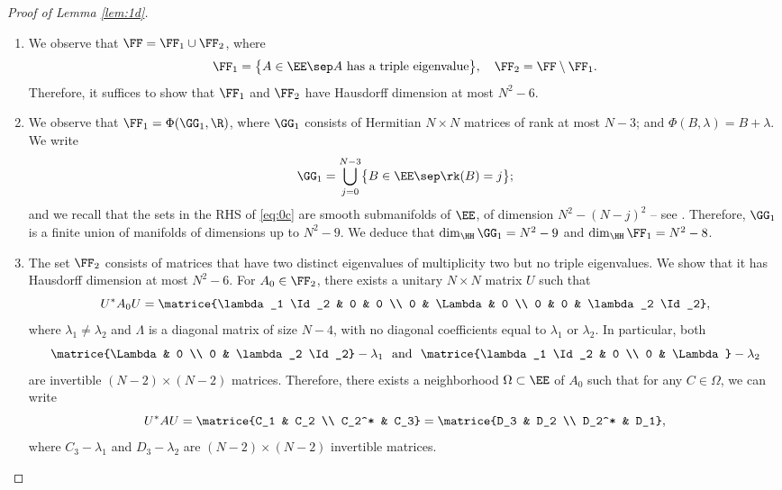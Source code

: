 \skpt
\begin{proof}[Proof of Lemma \ref{lem:1d}]
\begin{enumerate}
\item
We observe that $\FF= \FF_1 \cup \FF_2$, where
\begin{equation*}
\FF_1 = \bigl\{A \in \EE \sep \text{$A$ has a triple eigenvalue} \bigr\}, \quad
\FF_2 = \FF \setminus \FF_1.
\end{equation*}
Therefore, it suffices to show that $\FF_1$ and $\FF_2$ have Hausdorff dimension at most $N^2-6$.

\item
We observe that $\FF_1 = \Phi(\GG_1,\R)$, where $\GG_1$ consists of Hermitian $N \times N$ matrices of rank at most $N-3$; and $\Phi(B,\lambda) = B+\lambda$. We write
\begin{equation}\label{eq:0c}
\GG_1 = \bigcup_{j=0}^{N-3} \bigl\{ B \in \EE \sep \rk(B) = j\bigr\};
\end{equation}
and we recall that the sets in the RHS of \eqref{eq:0c} are smooth submanifolds of $\EE$, of dimension $N^2-(N-j)^2$ -- see \eg \cite[\S1.4]{GP74}. Therefore, $\GG_1$ is a finite union of manifolds of dimensions up to $N^2-9$. We deduce that $\dim_{\HH}\GG_1 = N^2-9$ and $\dim_\HH \FF_1 = N^2-8$.

\item
The set $\FF_2$ consists of matrices that have two distinct eigenvalues of multiplicity two but no triple eigenvalues.
We show that it has Hausdorff dimension at most $N^2-6$. For $A_0 \in \FF_2$, there exists a unitary $N \times N$ matrix $U$ such that
\begin{equation*}
U^* A_0 U= \matrice{\lambda_1 \Id_2 & 0 & 0 \\ 0 & \Lambda & 0 \\ 0 & 0 & \lambda_2 \Id_2},
\end{equation*}
where $\lambda_1 \neq \lambda_2$ and $\Lambda$ is a diagonal matrix of size $N-4$, with no diagonal coefficients equal to $\lambda_1$ or $\lambda_2$. In particular, both
\begin{equation*}
\matrice{\Lambda & 0 \\ 0 & \lambda_2 \Id_2} - \lambda_1 \ \ \text{and} \ \ \matrice{\lambda_1 \Id_2 & 0 \\ 0 & \Lambda } - \lambda_2
\end{equation*}
are invertible $(N-2) \times (N-2)$ matrices. Therefore, there exists a neighborhood $\Omega \subset \EE$ of $A_0$ such that for any $C \in \Omega$, we can write
\begin{equation*}
U^* A U = \matrice{C_1 & C_2 \\ C_2^* & C_3} = \matrice{D_3 & D_2 \\ D_2^* & D_1} ,
\end{equation*}
where $C_3 - \lambda_1$ and $D_3-\lambda_2$ are $(N-2) \times (N-2)$ invertible matrices.


\end{enumerate}
\end{proof}
